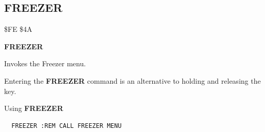 
\newpage
\subsection{FREEZER}
\begin{description}[leftmargin=2cm,style=nextline]
\item [Token:] \$FE \$4A
\item [Format:] {\bf FREEZER}
\item [Usage:] Invokes the Freezer menu.

\item [Remarks:]
      Entering the {\bf FREEZER} command is an alternative
      to holding and releasing the  key.

\item [Examples:] Using {\bf FREEZER}
\begin{tcolorbox}[colback=black,coltext=white]
\verbatimfont{\codefont}
\begin{verbatim}
  FREEZER :REM CALL FREEZER MENU
\end{verbatim}
\end{tcolorbox}
\end{description}


\newpage
